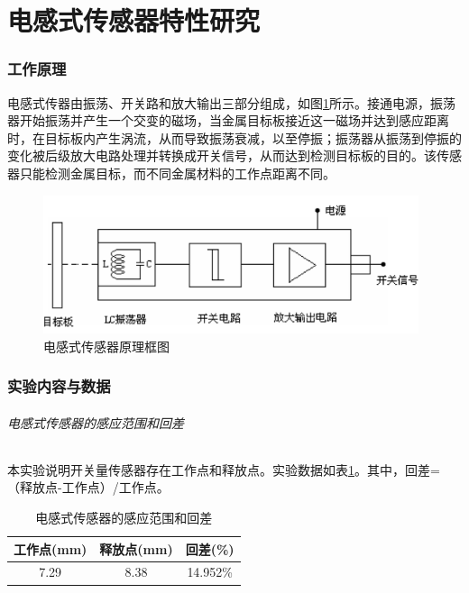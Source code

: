 \part{电感式传感器特性研究}
	\section{工作原理}
	电感式传器由振荡、开关路和放大输出三部分组成，如图\ref{fig:sp}所示。接通电源，振荡器开始振荡并产生一个交变的磁场，当金属目标板接近这一磁场并达到感应距离时，在目标板内产生涡流，从而导致振荡衰减，以至停振；振荡器从振荡到停振的变化被后级放大电路处理并转换成开关信号，从而达到检测目标板的目的。该传感器只能检测金属目标，而不同金属材料的工作点距离不同。
	\begin{figure}[htbp]
	\centering
	\includegraphics[width=11cm]{resource/principle.png}
	\caption{电感式传感器原理框图}
	\label{fig:sp}
	\end{figure}

	\section{实验内容与数据}
	\paragraph{电感式传感器的感应范围和回差} 本实验说明开关量传感器存在工作点和释放点。实验数据如表\ref{tab:srr}。其中，回差=（释放点-工作点）/工作点。
	\begin{table}[htbp]
		\centering
		\begin{tabular}{|c|c|c|}
			\hline
			工作点(mm) & 释放点(mm) & 回差(\%) \\
			\hline
			7.29 & 8.38 & 14.952\% \\
			\hline
		\end{tabular}
		\caption{电感式传感器的感应范围和回差}
		\label{tab:srr}
	\end{table}

